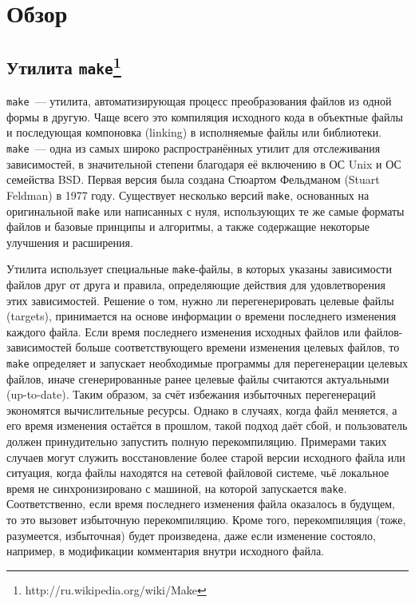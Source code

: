 \section{Обзор}

\subsection[Утилита \texttt{make}]{Утилита \texttt{make}\footnote{http://ru.wikipedia.org/wiki/Make}}
\texttt{make}~--- утилита, автоматизирующая процесс преобразования файлов из одной формы в другую. Чаще всего это компиляция исходного кода в объектные файлы и последующая компоновка (linking) в исполняемые файлы или библиотеки. \texttt{make}~--- одна из самых широко распространённых утилит для отслеживания зависимостей, в значительной степени благодаря её включению в ОС Unix и ОС семейства BSD. Первая версия была создана Стюартом Фельдманом (Stuart Feldman) в 1977 году. Существует несколько версий \texttt{make}, основанных на оригинальной \texttt{make} или написанных с нуля, использующих те же самые форматы файлов и базовые принципы и алгоритмы, а также содержащие некоторые улучшения и расширения.

Утилита использует специальные \texttt{make}-файлы, в которых указаны зависимости файлов друг от друга и правила, определяющие действия для удовлетворения этих зависимостей. Решение о том, нужно ли перегенерировать целевые файлы (targets), принимается на основе информации о времени последнего изменения каждого файла. Если время последнего изменения исходных файлов или файлов-зависимостей больше соответствующего времени изменения целевых файлов, то \texttt{make} определяет и запускает необходимые программы для перегенерации целевых файлов, иначе сгенерированные ранее целевые файлы считаются актуальными (up-to-date). Таким образом, за счёт избежания избыточных перегенераций экономятся вычислительные ресурсы. Однако в случаях, когда файл меняется, а его время изменения остаётся в прошлом, такой подход даёт сбой, и пользователь должен принудительно запустить полную перекомпиляцию. Примерами таких случаев могут служить восстановление более старой версии исходного файла или ситуация, когда файлы находятся на сетевой файловой системе, чьё локальное время не синхронизировано с машиной, на которой запускается \texttt{make}. Соответственно, если время последнего изменения файла оказалось в будущем, то это вызовет избыточную перекомпиляцию. Кроме того, перекомпиляция (тоже, разумеется, избыточная) будет произведена, даже если изменение состояло, например, в модификации комментария внутри исходного файла.

